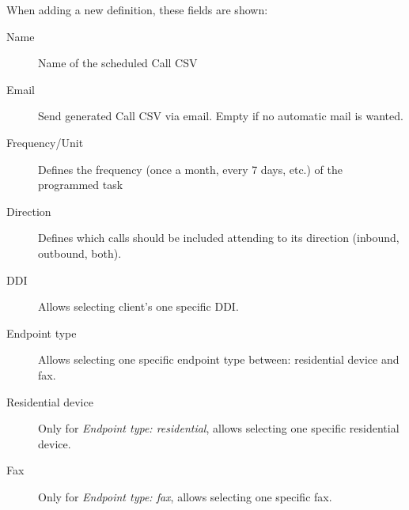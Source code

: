 \documentclass[letterpaper,10pt,english]{sphinxmanual}
\begin{document}
When adding a new definition, these fields are shown:
\begin{description}
\item[{Name}] \leavevmode{}\label{administration_portal/client/residential/calls/call_csv_schedulers:term-name}
Name of the scheduled Call CSV

\item[{Email}] \leavevmode{}\label{administration_portal/client/residential/calls/call_csv_schedulers:term-email}
Send generated Call CSV via email. Empty if no automatic mail is wanted.

\item[{Frequency/Unit}] \leavevmode{}\label{administration_portal/client/residential/calls/call_csv_schedulers:term-frequency-unit}
Defines the frequency (once a month, every 7 days, etc.) of the programmed task

\item[{Direction}] \leavevmode{}\label{administration_portal/client/residential/calls/call_csv_schedulers:term-direction}
Defines which calls should be included attending to its direction (inbound, outbound, both).

\item[{DDI}] \leavevmode{}\label{administration_portal/client/residential/calls/call_csv_schedulers:term-ddi}
Allows selecting client's one specific DDI.

\item[{Endpoint type}] \leavevmode{}\label{administration_portal/client/residential/calls/call_csv_schedulers:term-endpoint-type}
Allows selecting one specific endpoint type between: residential device and fax.

\item[{Residential device}] \leavevmode{}\label{administration_portal/client/residential/calls/call_csv_schedulers:term-residential-device}
Only for \emph{Endpoint type: residential}, allows selecting one specific residential device.

\item[{Fax}] \leavevmode{}\label{administration_portal/client/residential/calls/call_csv_schedulers:term-fax}
Only for \emph{Endpoint type: fax}, allows selecting one specific fax.

\end{description}
\end{document}

